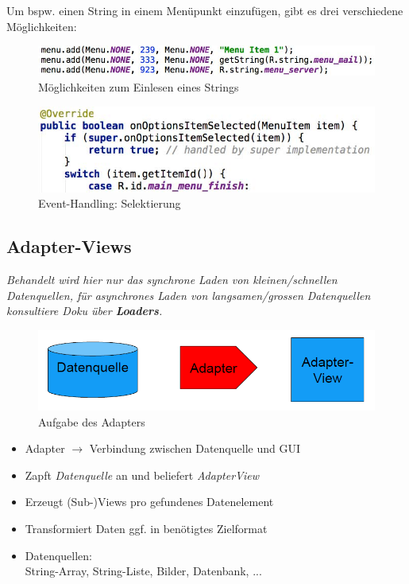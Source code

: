 \documentclass[a4paper]{article}
\begin{document}
Um bspw. einen String in einem Menüpunkt einzufügen, gibt es drei verschiedene Möglichkeiten:
\begin{figure}[htb!]
	\centering
	\includegraphics[width=.8\textwidth]{img/menu_string.jpg}
	\caption{Möglichkeiten zum Einlesen eines Strings}
\end{figure}
\begin{figure}[htb!]
	\centering
	\includegraphics[width=.7\textwidth]{img/menu_selektierung.jpg}
	\caption{Event-Handling: Selektierung}
\end{figure}

\newpage

\subsection{Adapter-Views}
\emph{Behandelt wird hier nur das synchrone Laden von kleinen/schnellen Datenquellen, für asynchrones Laden von langsamen/grossen Datenquellen konsultiere Doku über \textbf{Loaders}.}
\begin{figure}[htb!]
	\centering
	\includegraphics[width=.8\textwidth]{img/adapter.png}
	\caption{Aufgabe des Adapters}
\end{figure}
\begin{itemize}
	\item Adapter $\rightarrow$ Verbindung zwischen Datenquelle und GUI
	\item Zapft \textit{Datenquelle} an und beliefert \textit{AdapterView}
	\item Erzeugt (Sub-)Views pro gefundenes Datenelement
	\item Transformiert Daten ggf. in benötigtes Zielformat
	\item Datenquellen:\\
	String-Array, String-Liste, Bilder, Datenbank, ...
\end{itemize}
\end{document}
